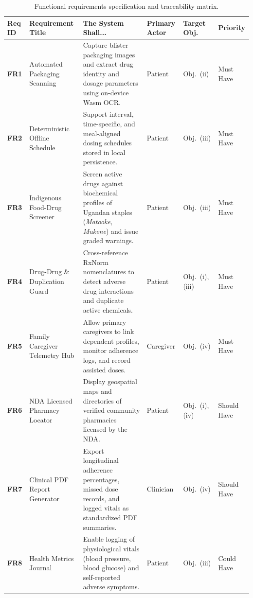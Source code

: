 \begin{table}[!htbp]
  \centering
  \caption{Functional requirements specification and traceability matrix.}
  \label{tab:functional_requirements}
  \scriptsize
  \setlength{\tabcolsep}{3pt}
  \begin{tabularx}{\textwidth}{@{} l >{\raggedright\arraybackslash}p{2.6cm} >{\raggedright\arraybackslash}X >{\raggedright\arraybackslash}p{1.7cm} >{\centering\arraybackslash}p{1.2cm} >{\centering\arraybackslash}p{1.3cm} @{}}
    \toprule
    \textbf{Req ID} & \textbf{Requirement Title} & \textbf{The System Shall...} & \textbf{Primary Actor} & \textbf{Target Obj.} & \textbf{Priority} \\
    \midrule
    \textbf{FR1} & Automated Packaging Scanning & Capture blister packaging images and extract drug identity and dosage parameters using on-device Wasm OCR. & Patient & Obj.~(ii) & Must Have \\
    \midrule
    \textbf{FR2} & Deterministic Offline Schedule & Support interval, time-specific, and meal-aligned dosing schedules stored in local persistence. & Patient & Obj.~(iii) & Must Have \\
    \midrule
    \textbf{FR3} & Indigenous Food-Drug Screener & Screen active drugs against biochemical profiles of Ugandan staples (\textit{Matooke}, \textit{Mukene}) and issue graded warnings. & Patient & Obj.~(iii) & Must Have \\
    \midrule
    \textbf{FR4} & Drug-Drug \& Duplication Guard & Cross-reference RxNorm nomenclatures to detect adverse drug interactions and duplicate active chemicals. & Patient & Obj.~(i), (iii) & Must Have \\
    \midrule
    \textbf{FR5} & Family Caregiver Telemetry Hub & Allow primary caregivers to link dependent profiles, monitor adherence logs, and record assisted doses. & Caregiver & Obj.~(iv) & Must Have \\
    \midrule
    \textbf{FR6} & NDA Licensed Pharmacy Locator & Display geospatial maps and directories of verified community pharmacies licensed by the NDA. & Patient & Obj.~(i), (iv) & Should Have \\
    \midrule
    \textbf{FR7} & Clinical PDF Report Generator & Export longitudinal adherence percentages, missed dose records, and logged vitals as standardized PDF summaries. & Clinician & Obj.~(iv) & Should Have \\
    \midrule
    \textbf{FR8} & Health Metrics Journal & Enable logging of physiological vitals (blood pressure, blood glucose) and self-reported adverse symptoms. & Patient & Obj.~(iii) & Could Have \\
    \bottomrule
  \end{tabularx}
\end{table}

